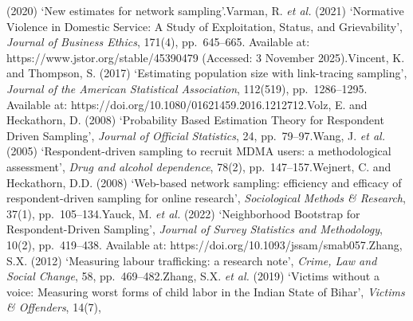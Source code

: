\documentclass[
  12pt,
  letterpaper,
  DIV=11,
  numbers=noendperiod]{scrartcl}
\begin{document}
{{(2020) `New estimates for network sampling'.Varman, R. \emph{et al.}
(2021) `Normative Violence in Domestic Service: A Study of Exploitation,
Status, and Grievability', \emph{Journal of Business Ethics}, 171(4),
pp.~645--665. Available at: https://www.jstor.org/stable/45390479
(Accessed: 3 November 2025).Vincent, K. and Thompson, S. (2017)
`Estimating population size with link-tracing sampling', \emph{Journal
of the American Statistical Association}, 112(519), pp.~1286--1295.
Available at: https://doi.org/10.1080/01621459.2016.1212712.Volz, E. and
Heckathorn, D. (2008) `Probability Based Estimation Theory for
Respondent Driven Sampling', \emph{Journal of Official Statistics}, 24,
pp.~79--97.Wang, J. \emph{et al.} (2005) `Respondent-driven sampling to
recruit MDMA users: a methodological assessment', \emph{Drug and alcohol
dependence}, 78(2), pp.~147--157.Wejnert, C. and Heckathorn, D.D. (2008)
`Web-based network sampling: efficiency and efficacy of
respondent-driven sampling for online research', \emph{Sociological
Methods \& Research}, 37(1), pp.~105--134.Yauck, M. \emph{et al.} (2022)
`Neighborhood Bootstrap for Respondent-Driven Sampling', \emph{Journal
of Survey Statistics and Methodology}, 10(2), pp.~419--438. Available
at: https://doi.org/10.1093/jssam/smab057.Zhang, S.X. (2012) `Measuring
labour trafficking: a research note', \emph{Crime, Law and Social
Change}, 58, pp.~469--482.Zhang, S.X. \emph{et al.} (2019) `Victims
without a voice: Measuring worst forms of child labor in the Indian
State of Bihar', \emph{Victims \& Offenders}, 14(7),
}}
\end{document}
